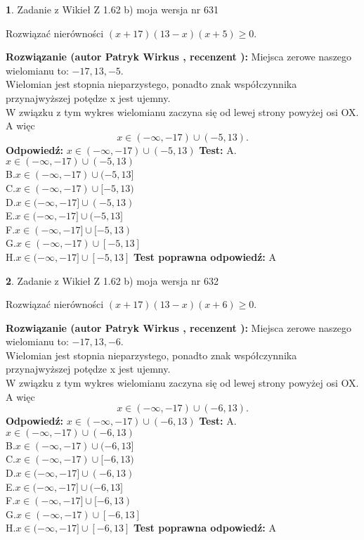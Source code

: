 \documentclass[12pt, a4paper]{article}
\theoremstyle{definition} %
\newtheorem{zad}{}
\newcommand{\zadStart}[1]{\begin{zad}#1\newline}
\newcommand{\zadStop}{\end{zad}}
\newcommand{\rozwStart}[2]{\noindent \textbf{Rozwiązanie (autor #1 , recenzent #2): }\newline}
\newcommand{\rozwStop}{\newline}
\newcommand{\odpStart}{\noindent \textbf{Odpowiedź:}\newline}
\newcommand{\odpStop}{\newline}
\newcommand{\testStart}{\noindent \textbf{Test:}\newline}
\newcommand{\testStop}{\newline}
\newcommand{\kluczStart}{\noindent \textbf{Test poprawna odpowiedź:}\newline}
\newcommand{\kluczStop}{\newline}
\begin{document}
\zadStart{Zadanie z Wikieł Z 1.62 b) moja wersja nr 631}

Rozwiązać nierówności $(x+17)(13-x)(x+5)\ge0$.
\zadStop
\rozwStart{Patryk Wirkus}{}
Miejsca zerowe naszego wielomianu to: $-17, 13, -5$.\\
Wielomian jest stopnia nieparzystego, ponadto znak współczynnika przy\linebreak najwyższej potędze x jest ujemny.\\ W związku z tym wykres wielomianu zaczyna się od lewej strony powyżej osi OX. A więc $$x \in (-\infty,-17) \cup (-5,13).$$
\rozwStop
\odpStart
$x \in (-\infty,-17) \cup (-5,13)$
\odpStop
\testStart
A.$x \in (-\infty,-17) \cup (-5,13)$\\
B.$x \in (-\infty,-17) \cup (-5,13]$\\
C.$x \in (-\infty,-17) \cup [-5,13)$\\
D.$x \in (-\infty,-17] \cup (-5,13)$\\
E.$x \in (-\infty,-17] \cup (-5,13]$\\
F.$x \in (-\infty,-17] \cup [-5,13)$\\
G.$x \in (-\infty,-17) \cup [-5,13]$\\
H.$x \in (-\infty,-17] \cup [-5,13]$
\testStop
\kluczStart
A
\kluczStop



\zadStart{Zadanie z Wikieł Z 1.62 b) moja wersja nr 632}

Rozwiązać nierówności $(x+17)(13-x)(x+6)\ge0$.
\zadStop
\rozwStart{Patryk Wirkus}{}
Miejsca zerowe naszego wielomianu to: $-17, 13, -6$.\\
Wielomian jest stopnia nieparzystego, ponadto znak współczynnika przy\linebreak najwyższej potędze x jest ujemny.\\ W związku z tym wykres wielomianu zaczyna się od lewej strony powyżej osi OX. A więc $$x \in (-\infty,-17) \cup (-6,13).$$
\rozwStop
\odpStart
$x \in (-\infty,-17) \cup (-6,13)$
\odpStop
\testStart
A.$x \in (-\infty,-17) \cup (-6,13)$\\
B.$x \in (-\infty,-17) \cup (-6,13]$\\
C.$x \in (-\infty,-17) \cup [-6,13)$\\
D.$x \in (-\infty,-17] \cup (-6,13)$\\
E.$x \in (-\infty,-17] \cup (-6,13]$\\
F.$x \in (-\infty,-17] \cup [-6,13)$\\
G.$x \in (-\infty,-17) \cup [-6,13]$\\
H.$x \in (-\infty,-17] \cup [-6,13]$
\testStop
\kluczStart
A
\kluczStop
\end{document}
